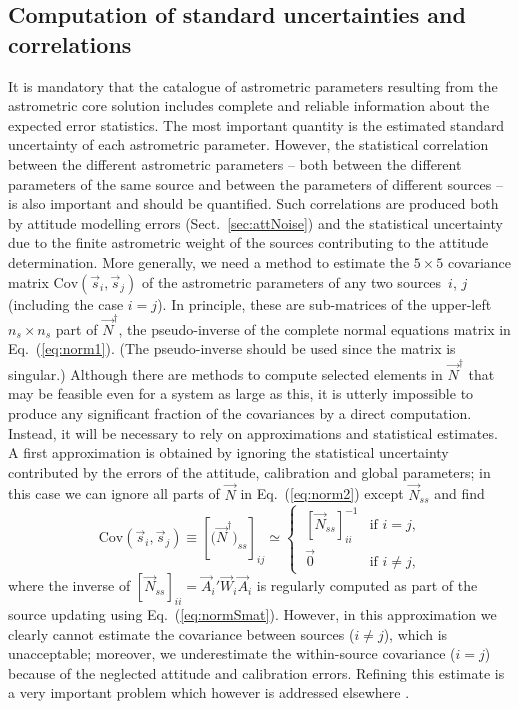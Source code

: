 \documentclass[structabstract]{aa}
\begin{document}
\subsection{Computation of standard uncertainties and correlations} \label{sec:cov}

It is mandatory that the catalogue of astrometric parameters resulting from
the astrometric core solution includes complete and reliable information 
about the expected error statistics. The most important quantity is the 
estimated standard uncertainty of each astrometric parameter. However, the
statistical correlation between the different astrometric parameters -- 
both between the different parameters of the same source and between 
the parameters of different sources -- is also important and should
be quantified. Such correlations are produced both by attitude modelling 
errors (Sect.~\ref{sec:attNoise}) and the statistical uncertainty due to the
finite astrometric weight of the sources contributing to the attitude
determination. 
More generally, we need a method to estimate the $5\times 5$
covariance matrix $\text{Cov}(\vec{s}_i,\vec{s}_j)$ of the astrometric
parameters of any two sources~$i$, $j$ (including the case $i=j$). In principle,
these are sub-matrices of the upper-left $n_s\times n_s$ part of 
$\vec{N}^\dagger$, the pseudo-inverse of the complete normal equations 
matrix in Eq.~(\ref{eq:norm1}). (The pseudo-inverse should be used since
the matrix is singular.) Although there are methods to compute 
selected elements in $\vec{N}^\dagger$ that may be feasible even for a system 
as large as this, it is utterly impossible to produce any significant fraction
of the covariances by a direct computation. Instead, it will be necessary to
rely on approximations and statistical estimates. A first approximation
is obtained by ignoring the statistical uncertainty contributed by the 
errors of the attitude, calibration and global parameters; in this 
case we can ignore all parts of $\vec{N}$ in Eq.~(\ref{eq:norm2}) except
$\vec{N}_{ss}$ and find
\begin{equation}\label{eq:cov}
\text{Cov}(\vec{s}_i,\vec{s}_j) \equiv \left[\big(\vec{N}^\dagger\big)_{ss}\right]_{ij}
\simeq 
\begin{cases} 
~\left[\vec{N}_{ss}\right]_{ii}^{-1} & \text{if $i=j$,}\\[3pt]
~\vec{0} & \text{if $i\ne j$,}
\end{cases}
\end{equation}
where the inverse of $\left[\vec{N}_{ss}\right]_{ii}=\vec{A}_i' \vec{W}_i \vec{A}_i$
is regularly computed as part of the source updating using Eq.~(\ref{eq:normSmat}). 
However, in this approximation we clearly cannot 
estimate the covariance between sources ($i\ne j$), which is unacceptable;
moreover, we underestimate the within-source covariance
($i=j$) because of the neglected attitude and calibration errors.
Refining this estimate is a very important problem which however is 
addressed elsewhere \citep{holl+2010,holl+2010a}.
\end{document}
